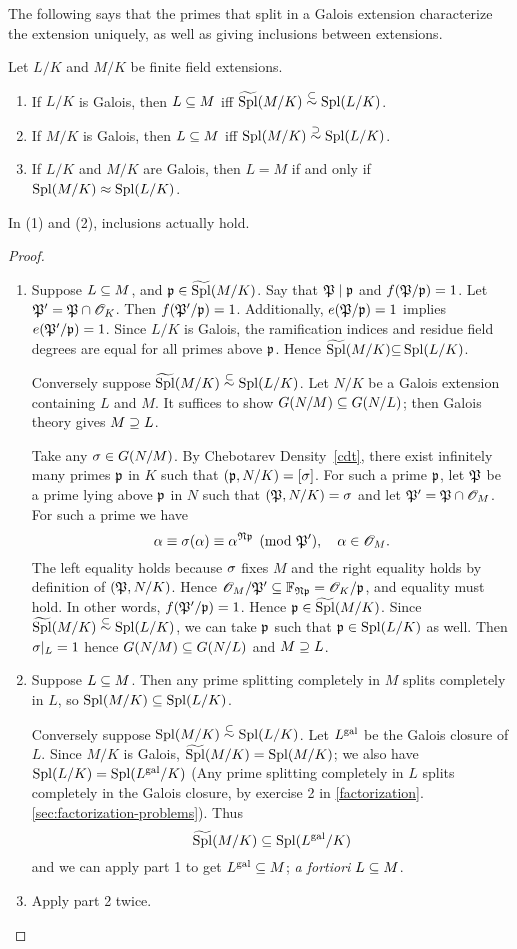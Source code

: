 The following says that the primes that split in a Galois extension characterize the extension uniquely, as well as giving inclusions between extensions.
\begin{thm}
Let $L/K$ and $M/K$ be finite field extensions. %
\begin{enumerate}
\item If $L/K$ is Galois, then $L\subseteq M$ iff $\widetilde{\operatorname{Spl}}(M/K)\stackrel{\subset}{\sim}\operatorname{Spl}(L/K)$.
\item If $M/K$ is Galois, then $L\subseteq M$ iff $\operatorname{Spl}(M/K)\stackrel{\supset}{\sim}\operatorname{Spl}(L/K)$.
\item If $L/K$ and $M/K$ are Galois, then $L=M$ if and only if $\operatorname{Spl}(M/K)\approx\operatorname{Spl}(L/K)$. 
\end{enumerate}
In (1) and (2), inclusions actually hold.
\end{thm}
\begin{proof}$\,$
\begin{enumerate}
\item Suppose $L\subseteq M$, and $\mathfrak{p}\in \widetilde{\operatorname{Spl}}(M/K)$. Say that $\mathfrak{P}\mid \mathfrak{p}$ and $f(\mathfrak{P}/\mathfrak{p})=1$. Let $\mathfrak{P}'=\mathfrak{P}\cap \mathscr{O}_K$. 
Then $f(\mathfrak{P}'/\mathfrak{p})=1$. Additionally, $e(\mathfrak{P}/\mathfrak{p})=1$ implies $e(\mathfrak{P}'/\mathfrak{p})=1$. Since $L/K$ is Galois, the ramification indices and residue field degrees are equal for all primes above $\mathfrak{p}$. Hence $\widetilde{\operatorname{Spl}}(M/K){\subseteq} \operatorname{Spl}(L/K)$.

Conversely suppose $\widetilde{\operatorname{Spl}}(M/K)\stackrel{\subset}{\sim} \operatorname{Spl}(L/K)$. Let $N/K$ be a Galois extension containing $L$ and $M$. It suffices to show $G(N/M)\subseteq G(N/L)$; then Galois theory gives $M\supseteq L$.

Take any $\sigma\in G(N/M)$. 
By Chebotarev Density~\ref{cdt}, there exist infinitely many primes $\mathfrak{p}$ in $K$ such that $(\mathfrak{p}, N/K)=[\sigma]$. For such a prime $\mathfrak{p}$, let $\mathfrak{P}$ be a prime lying above $\mathfrak{p}$ in $N$ such that $(\mathfrak{P},N/K)=\sigma$ and let $\mathfrak{P}'=\mathfrak{P}\cap \mathscr{O}_M$. 
For such a prime we have
\[
\alpha \equiv \sigma(\alpha)\equiv \alpha^{\mathfrak{N} \mathfrak{p}}\pmod{\mathfrak{P}'}, \quad \alpha\in \mathscr{O}_M.
\]
The left equality holds because $\sigma$ fixes $M$ and the right equality holds by definition of $(\mathfrak{P},N/K)$. Hence $\mathscr{O}_M/\mathfrak{P}'\subseteq \mathbb{F}_{\mathfrak{N}\mathfrak{p}}=\mathscr{O}_K/\mathfrak{p}$, and equality must hold. In other words, $f(\mathfrak{P}'/\mathfrak{p})=1$. Hence $\mathfrak{p}\in \widetilde{\operatorname{Spl}}(M/K)$. Since $\widetilde{\operatorname{Spl}}(M/K)\stackrel{\subset}{\sim} \operatorname{Spl}(L/K)$, we can take $\mathfrak{p}$ such that $\mathfrak{p}\in \operatorname{Spl}(L/K)$ as well. Then $\sigma|_L=1$ hence $G(N/M)\subseteq G(N/L)$ and $M\supseteq L$.
\item
Suppose $L\subseteq M$. Then any prime splitting completely in $M$ splits completely in $L$, so $\operatorname{Spl}(M/K)\subseteq \operatorname{Spl}(L/K)$.

Conversely suppose $\operatorname{Spl}(M/K)\stackrel{\subset}{\sim} \operatorname{Spl}(L/K)$. Let $L^{\text{gal}}$ be the Galois closure of $L$. Since $M/K$ is Galois, $\widetilde{\operatorname{Spl}}(M/K)=\operatorname{Spl}(M/K)$; we also have $\operatorname{Spl}(L/K)=\operatorname{Spl}(L^{\text{gal}}/K)$ (Any prime splitting completely in $L$ splits completely in the Galois closure, by exercise 2 in \ref{factorization}.\ref{sec:factorization-problems}).
Thus
\[
\widetilde{\operatorname{Spl}}(M/K)\subseteq \operatorname{Spl}(L^{\text{gal}}/K)
\]
and we can apply part 1 to get $L^{\text{gal}}\subseteq M$; {\it a fortiori} $L\subseteq M$.
\item Apply part 2 twice.\qedhere
\end{enumerate}
\end{proof}
